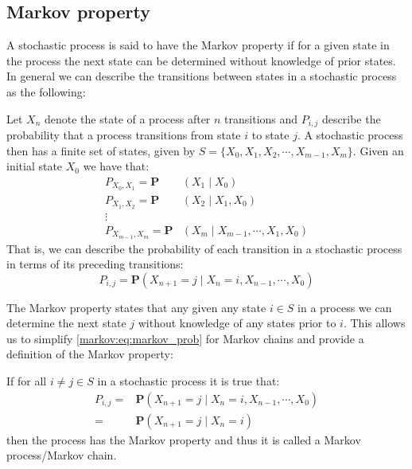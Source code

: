 \subsection{Markov property}\label{markov:property}
A stochastic process is said to have the Markov property if for a given state in the process the next state can be determined without knowledge of prior states.
In general we can describe the transitions between states in a stochastic process as the following:

Let $X_n$ denote the state of a process after $n$ transitions and $P_{i,j}$ describe the probability that a process transitions from state $i$ to state $j$.
A stochastic process then has a finite set of states, given by $S = \{X_0, X_1, X_2,\cdots, X_{m-1}, X_m\}$.
Given an initial state $X_0$ we have that:
\begin{align*}
P_{X_0,X_1} = \mathbf{P}&(X_1 \mid X_0)\\
P_{X_1,X_2} = \mathbf{P}&(X_2 \mid X_1, X_0)\\
\vdots\\
P_{X_{m-1},X_m} = \mathbf{P}&(X_m \mid X_{m-1}, \cdots, X_1, X_0)
\end{align*}
That is, we can describe the probability of each transition in a stochastic process in terms of its preceding transitions:
\begin{equation}\label{markov:eq:stochastic_prob}
P_{i,j} = \mathbf{P}(X_{n+1} = j \mid X_n = i, X_{n-1}, \cdots, X_0)
\end{equation}

The Markov property states that any given any state $i \in S$ in a process we can determine the next state $j$ without knowledge of any states prior to $i$.
This allows us to simplify \cref{markov:eq:markov_prob} for Markov chains and provide a definition of the Markov property:

If for all $i \neq j \in S$ in a stochastic process it is true that:
\begin{align}\label{markov:eq:markov_prob}
P_{i,j} = &\mathbf{P}(X_{n+1} = j \mid X_n = i, X_{n-1}, \cdots, X_0) \nonumber\\
        = &\mathbf{P}(X_{n+1} = j \mid X_n = i)
\end{align}
then the process has the Markov property and thus it is called a Markov process/Markov chain.
